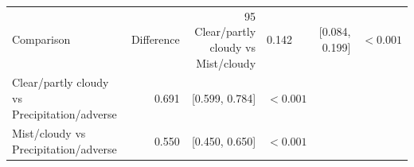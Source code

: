 \begin{tabular}{lrrlr}
\toprule
Comparison & Difference & 95%
\midrule
Clear/partly cloudy vs Mist/cloudy & 0.142 & [0.084, 0.199] & $<0.001$ \\
Clear/partly cloudy vs Precipitation/adverse & 0.691 & [0.599, 0.784] & $<0.001$ \\
Mist/cloudy vs Precipitation/adverse & 0.550 & [0.450, 0.650] & $<0.001$ \\
\bottomrule
\end{tabular}
